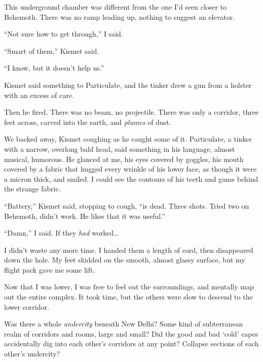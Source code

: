 This underground chamber was different from the one I'd seen closer to Behemoth.  There was no ramp leading up, nothing to suggest an elevator.



``Not sure how to get through,'' I said.



``Smart of them,'' Kismet said.



``I know, but it doesn't help us.''



Kismet said something to Particulate, and the tinker drew a gun from a holster with an excess of care.



Then he fired.  There was no beam, no projectile.  There was only a corridor, three feet across, carved into the earth, and \emph{plumes }of dust.



We backed away, Kismet coughing as he caught some of it.  Particulate, a tinker with a narrow, overlong bald head, said something in his language, almost musical, humorous.  He glanced at me, his eyes covered by goggles, his mouth covered by a fabric that hugged every wrinkle of his lower face, as though it were a micron thick, and smiled.  I could see the contours of his teeth and gums behind the strange fabric.



``Battery,'' Kismet said, stopping to cough, ``is dead.  Three shots.  Tried two on Behemoth, didn't work.  He likes that it was useful.''



``Damn,'' I said.  If they \emph{had }worked\ldots



I didn't waste any more time.  I handed them a length of cord, then disappeared down the hole.  My feet skidded on the smooth, almost glassy surface, but my flight pack gave me some lift.



Now that I was lower, I was free to feel out the surroundings, and mentally map out the entire complex.  It took time, but the others were slow to descend to the lower corridor.



Was there a whole \emph{undercity} beneath New Delhi?  Some kind of subterranean realm of corridors and rooms, large and small?  Did the good and bad `cold' capes accidentally dig into each other's corridors at any point?  Collapse sections of each other's undercity?



